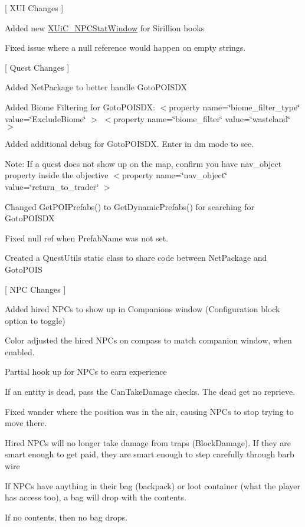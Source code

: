 \mbox{[} XUI Changes \mbox{]}
\begin{DoxyItemize}
\item Added new \mbox{\hyperlink{class_x_ui_c___n_p_c_stat_window}{XUi\+C\+\_\+\+NPCStat\+Window}} for Sirillion hooks
\item Fixed issue where a null reference would happen on empty strings.
\end{DoxyItemize}

\mbox{[} Quest Changes \mbox{]}
\begin{DoxyItemize}
\item Added Net\+Package to better handle Goto\+POISDX
\item Added Biome Filtering for Goto\+POISDX\+: $<$property name=\char`\"{}biome\+\_\+filter\+\_\+type\char`\"{} value=\char`\"{}\+Exclude\+Biome\char`\"{} $>$ $<$property name=\char`\"{}biome\+\_\+filter\char`\"{} value=\char`\"{}wasteland\char`\"{} $>$
\item Added additional debug for Goto\+POISDX. Enter in dm mode to see.
\item Note\+: If a quest does not show up on the map, confirm you have nav\+\_\+object property inside the objective $<$property name=\char`\"{}nav\+\_\+object\char`\"{} value=\char`\"{}return\+\_\+to\+\_\+trader\char`\"{} $>$
\item Changed Get\+POIPrefabs() to Get\+Dynamic\+Prefabs() for searching for Goto\+POISDX
\item Fixed null ref when Prefab\+Name was not set.
\item Created a Quest\+Utils static class to share code between Net\+Package and Goto\+POIS
\end{DoxyItemize}

\mbox{[} NPC Changes \mbox{]}
\begin{DoxyItemize}
\item Added hired NPCs to show up in Companions window (Configuration block option to toggle)
\item Color adjusted the hired NPCs on compass to match companion window, when enabled.
\item Partial hook up for NPCs to earn experience
\item If an entity is dead, pass the Can\+Take\+Damage checks. The dead get no reprieve.
\item Fixed wander where the position was in the air, causing NPCs to stop trying to move there. ~\newline

\item Hired NPCs will no longer take damage from traps (Block\+Damage). If they are smart enough to get paid, they are smart enough to step carefully through barb wire
\item If NPCs have anything in their bag (backpack) or loot container (what the player has access too), a bag will drop with the contents.
\begin{DoxyItemize}
\item If no contents, then no bag drops.
\end{DoxyItemize}
\end{DoxyItemize}

